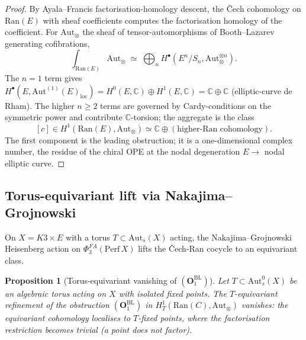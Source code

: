 \documentclass[11pt]{amsart}
\newtheorem{proposition}[theorem]{Proposition}
\newcommand{\Ran}{\mathrm{Ran}}
\newcommand{\Perf}{\mathrm{Perf}}
\newcommand{\bC}{\mathbb{C}}
\newcommand{\Aut}{\mathrm{Aut}}
\begin{document}
\begin{proof}
By Ayala--Francis factorisation-homology descent, the \v{C}ech
cohomology on $\Ran(E)$ with sheaf coefficients computes the
factorisation homology of the coefficient. For
$\mathrm{Aut}_\otimes$ the sheaf of tensor-automorphisms of
Booth--Lazarev generating cofibrations,
\[
\int_{\Ran(E)} \mathrm{Aut}_\otimes \;\simeq\;
\bigoplus_n H^\bullet(E^n/S_n, \mathrm{Aut}_\otimes^{\otimes n}).
\]
The $n=1$ term gives $H^\bullet(E, \mathrm{Aut}^{(1)}(E)_{\mathrm{loc}})
= H^0(E, \bC) \oplus H^1(E, \bC) = \bC \oplus \bC$ (elliptic-curve
de Rham). The higher $n\geq 2$ terms are governed by
Cardy-conditions on the symmetric power and contribute
$\bC$-torsion; the aggregate is the class
\[
[c] \in H^1(\Ran(E), \mathrm{Aut}_\otimes) \simeq
\bC \oplus (\text{higher-Ran cohomology}).
\]
The first component is the leading obstruction; it is a
one-dimensional complex number, the residue of the chiral OPE at
the nodal degeneration $E \to $ nodal elliptic curve.
\end{proof}

\subsection{Torus-equivariant lift via Nakajima--Grojnowski}

On $X = K3 \times E$ with a torus $T \subset \Aut_s(X)$ acting, the
Nakajima--Grojnowski Heisenberg action on $\Phi^{FA}_3(\Perf\,X)$
lifts the \v{C}ech-Ran cocycle to an equivariant class.

\begin{proposition}[Torus-equivariant vanishing of
$(\mathbf{O}_1^{\mathrm{BL}})$]
\label{prop:O1-torus-lift}
Let $T \subset \Aut^0_s(X)$ be an algebraic torus acting on $X$ with
isolated fixed points. The $T$-equivariant refinement of the
obstruction $(\mathbf{O}_1^{\mathrm{BL}})$ in
$H^1_T(\Ran(C), \mathrm{Aut}_\otimes)$ vanishes: the equivariant
cohomology localises to $T$-fixed points, where the factorisation
restriction becomes trivial (a point does not factor).
\end{proposition}
\end{document}
